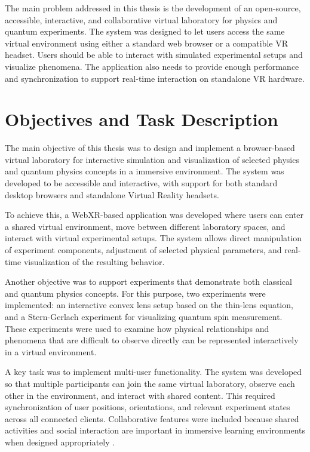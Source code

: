 The main problem addressed in this thesis is the development of an open-source, accessible, interactive, and collaborative virtual laboratory for physics and quantum experiments. The system was designed to let users access the same virtual environment using either a standard web browser or a compatible VR headset. Users should be able to interact with simulated experimental setups and visualize phenomena. The application also needs to provide enough performance and synchronization to support real-time interaction on standalone VR hardware.



\section{Objectives and Task Description}

The main objective of this thesis was to design and implement a browser-based virtual laboratory for interactive simulation and visualization of selected physics and quantum physics concepts in a immersive environment. The system was developed to be accessible and interactive, with support for both standard desktop browsers and standalone Virtual Reality headsets.

To achieve this, a WebXR-based application was developed where users can enter a shared virtual environment, move between different laboratory spaces, and interact with virtual experimental setups. The system allows direct manipulation of experiment components, adjustment of selected physical parameters, and real-time visualization of the resulting behavior.

Another objective was to support experiments that demonstrate both classical and quantum physics concepts. For this purpose, two experiments were implemented: an interactive convex lens setup based on the thin-lens equation, and a Stern-Gerlach experiment for visualizing quantum spin measurement. These experiments were used to examine how physical relationships and phenomena that are difficult to observe directly can be represented interactively in a virtual environment.

A key task was to implement multi-user functionality. The system was developed so that multiple participants can join the same virtual laboratory, observe each other in the environment, and interact with shared content. This required synchronization of user positions, orientations, and relevant experiment states across all connected clients. Collaborative features were included because shared activities and social interaction are important in immersive learning environments when designed appropriately \cite{paulsen2024collaborative}.

